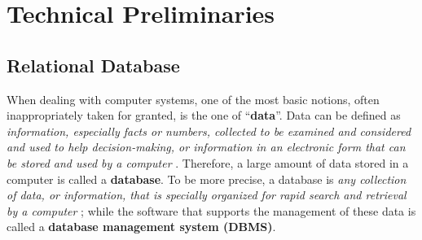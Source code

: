 \chapter{Technical Preliminaries}
\label{capitolo3}
\thispagestyle{empty}

\section{Relational Database}
When dealing with computer systems, one of the most basic notions, often inappropriately taken for granted, is the one of ``\textbf{data}''. Data can be defined as \emph{information, especially facts or numbers, collected to be examined and considered and used to help decision-making, or information in an electronic form that can be stored and used by a computer} \cite{cambridge2013data}.
Therefore, a large amount of data stored in a computer is called a \textbf{database}. To be more precise, a database is \emph{any collection of data, or information, that is specially organized for rapid search and retrieval by a computer} \cite{britannica2020database}; while the software that supports the management of these data is called a \textbf{database management system (DBMS)}.


